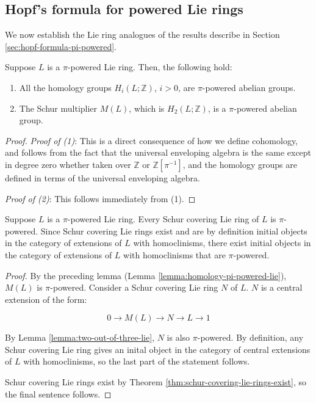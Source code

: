 \subsection{Hopf's formula for powered Lie rings}\label{sec:hopf-formula-pi-powered-lie}

We now establish the Lie ring analogues of the results describe in
Section \ref{sec:hopf-formula-pi-powered}.

\begin{lemma}\label{lemma:homology-pi-powered-lie}
  Suppose $L$ is a $\pi$-powered Lie ring. Then, the following hold:

  \begin{enumerate}
    \item All the homology groups $H_i(L;\mathbb{Z})$, $i > 0$, are
      $\pi$-powered abelian groups.
    \item The Schur multiplier $M(L)$, which is $H_2(L;\mathbb{Z})$, is
      a $\pi$-powered abelian group.
\end{enumerate}
\end{lemma}

\begin{proof}
  {\em Proof of (1)}: This is a direct consequence of how we define
  cohomology, and follows from the fact that the universal enveloping
  algebra is the same except in degree zero whether taken over
  $\mathbb{Z}$ or $\mathbb{Z}[\pi^{-1}]$, and the homology groups are
  defined in terms of the universal enveloping algebra. %

  {\em Proof of (2)}: This follows immediately from (1).
\end{proof}

\begin{lemma}\label{lemma:schur-cover-pi-powered-lie}
  Suppose $L$ is a $\pi$-powered  Lie ring. Every Schur covering
  Lie ring of $L$ is $\pi$-powered. Since Schur covering Lie rings exist and
  are by definition initial objects in the category of extensions of
  $L$ with homoclinisms, there exist initial objects in the category
  of extensions of $L$ with homoclinisms that are $\pi$-powered.
\end{lemma}

\begin{proof}
  By the preceding lemma (Lemma \ref{lemma:homology-pi-powered-lie}),
  $M(L)$ is $\pi$-powered. Consider a Schur covering Lie ring $N$ of
  $L$. $N$ is a central extension of the form:

  $$0 \to M(L) \to N \to L \to 1$$

  By Lemma \ref{lemma:two-out-of-three-lie}, $N$ is also
  $\pi$-powered. By definition, any Schur covering Lie ring gives an
  inital object in the category of central extensions of $L$ with
  homoclinisms, so the last part of the statement follows.

  Schur covering Lie rings exist by Theorem
  \ref{thm:schur-covering-lie-rings-exist}, so the final sentence
  follows.
\end{proof}

